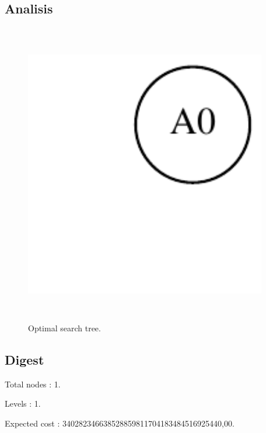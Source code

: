\documentclass{article}
\begin{document}
\subsection{Analisis}
\begin{figure}[H]\centering
\noindent\includegraphics[height=500px, width=400px, keepaspectratio]{reports/tree.pdf}
\caption{Optimal search tree.}
\end{figure}
\newpage

\subsection{Digest}
\begin{compactitem}
\item Total nodes : {\Large 1}.
\item Levels : {\Large 1}.
\item Expected cost : {\Large 340282346638528859811704183484516925440,00}.
\end{compactitem}
\end{document}
